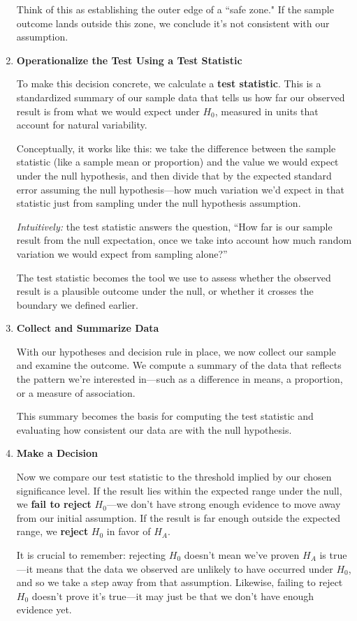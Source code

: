 \documentclass[12pt]{article}
\begin{document}
\begin{enumerate}
  Think of this as establishing the outer edge of a ``safe zone." If the sample outcome lands outside this zone, we conclude it’s not consistent with our assumption.

  \item \textbf{Operationalize the Test Using a Test Statistic}

  To make this decision concrete, we calculate a \textbf{test statistic}. This is a standardized summary of our sample data that tells us how far our observed result is from what we would expect under $H_0$, measured in units that account for natural variability.

  Conceptually, it works like this: we take the difference between the sample statistic (like a sample mean or proportion) and the value we would expect under the null hypothesis, and then divide that by the expected standard error assuming the null hypothesis—how much variation we’d expect in that statistic just from sampling under the null hypothesis assumption.

  \vspace{0.5em}
  \textit{Intuitively:} the test statistic answers the question, “How far is our sample result from the null expectation, once we take into account how much random variation we would expect from sampling alone?”

  The test statistic becomes the tool we use to assess whether the observed result is a plausible outcome under the null, or whether it crosses the boundary we defined earlier.

  \item \textbf{Collect and Summarize Data}

  With our hypotheses and decision rule in place, we now collect our sample and examine the outcome. We compute a summary of the data that reflects the pattern we’re interested in—such as a difference in means, a proportion, or a measure of association.

  This summary becomes the basis for computing the test statistic and evaluating how consistent our data are with the null hypothesis.

  \item \textbf{Make a Decision}

  Now we compare our test statistic to the threshold implied by our chosen significance level. If the result lies within the expected range under the null, we \textbf{fail to reject} $H_0$—we don’t have strong enough evidence to move away from our initial assumption. If the result is far enough outside the expected range, we \textbf{reject} $H_0$ in favor of $H_A$.

  It is crucial to remember: rejecting $H_0$ doesn’t mean we’ve proven $H_A$ is true—it means that the data we observed are unlikely to have occurred under $H_0$, and so we take a step away from that assumption. Likewise, failing to reject $H_0$ doesn’t prove it's true—it may just be that we don’t have enough evidence yet.

\end{enumerate}
\end{document}
